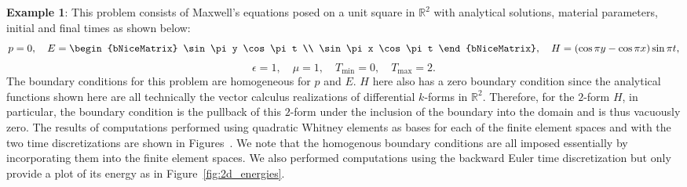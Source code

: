 \documentclass{amsart}
\theoremstyle{thmstyleone}%
\theoremstyle{thmstyletwo}%
\theoremstyle{thmstylethree}%
\def\R{\mathbb{R}}
\begin{document}
\medskip \noindent \textbf{Example 1}: This problem consists of Maxwell's equations posed on a unit square in $\R^2$ with analytical solutions, material parameters, initial and final times as shown below:
\[
  p = 0, \quad E = %
  \begin{bNiceMatrix}
    \sin \pi y \cos \pi t \\
    \sin \pi x \cos \pi t
  \end{bNiceMatrix}, %
  \quad H = (\cos \pi y - \cos \pi x) \sin \pi t,
\]
\[\epsilon = 1, \quad \mu = 1, \quad T_{\min} = 0 , \quad T_{\max} = 2.\]
The boundary conditions for this problem are homogeneous for $p$ and $E$. $H$ here also has a zero boundary condition since the analytical functions shown here are all technically the vector calculus realizations of differential $k$-forms in $\R^2$. Therefore, for the $2$-form $H$, in particular, the boundary condition is the pullback of this $2$-form under the inclusion of the boundary into the domain and is thus vacuously zero. The results of computations performed using quadratic Whitney elements as bases for each of the finite element spaces and with the two time discretizations are shown in Figures~. We note that the homogenous boundary conditions are all imposed essentially by incorporating them into the finite element spaces. We also performed computations using the backward Euler time discretization but only provide a plot of its energy as in Figure~\ref{fig:2d_energies}.
\end{document}

